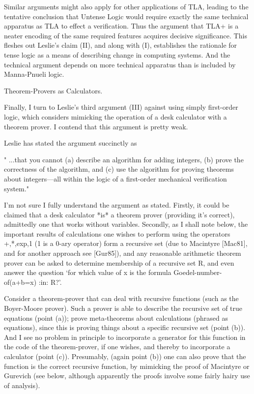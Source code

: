 \begin{spec}
Similar arguments might also apply for other applications of TLA,
leading to the tentative conclusion that Untense Logic would require
exactly the same technical apparatus as TLA to effect a
verification.  Thus the argument that TLA+ is a neater encoding of
the same required features acquires decisive significance. This
fleshes out Leslie's claim (II), and along with (I), establishes the
rationale for tense logic as a means of describing change in
computing systems. And the technical argument depends on more
technical apparatus than is included by Manna-Pnueli logic.

Theorem-Provers as Calculators.

Finally, I turn to Leslie's third argument (III) against using
simply first-order logic, which considers mimicking the operation of
a desk calculator with a theorem prover.  I contend that this
argument is pretty weak.

Leslie has stated the argument succinctly as

" ...that you cannot (a) describe an algorithm for adding integers,
(b) prove the correctness of the algorithm, and (c) use the
algorithm for proving theorems about integers---all within the logic
of a first-order mechanical verification system."

I'm not sure I fully understand the argument as stated. Firstly, it
could be claimed that a desk calculator *is* a theorem prover
(providing it's correct), admittedly one that works without
variables.  Secondly, as I shall note below, the important results
of calculations one wishes to perform using the operators +,*,exp,1
(1 is a 0-ary operator) form a recursive set (due to Macintyre
[Mac81], and for another approach see [Gur85]), and any reasonable
arithmetic theorem prover can be asked to determine membership
of a recursive set R, and even answer the question `for which value
of x is the formula Goedel-number-of(a+b=x) :in: R?'.

Consider a theorem-prover that can deal with recursive functions
(such as the Boyer-Moore prover). Such a prover is able to describe
the recursive set of true equations (point (a)); prove meta-theorems
about calculations (phrased as equations), since this is proving
things about a specific recursive set (point (b)).  And I see no
problem in principle to incorporate a generator for this function in
the code of the theorem-prover, if one wishes, and thereby to
incorporate a calculator (point (c)).  Presumably, (again point (b))
one can also prove that the function is the correct recursive
function, by mimicking the proof of Macintyre or Gurevich (see
below, although apparently the proofs involve some fairly hairy use
of analysis).


\end{spec}
